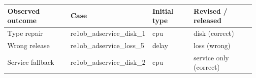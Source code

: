 \begin{tabular*}{\linewidth}{@{\extracolsep{\fill}}llll@{}}
\toprule
Observed outcome & Case & Initial type & Revised / released \\
\midrule
Type repair & re1ob\_adservice\_disk\_1 & cpu & disk (correct) \\
Wrong release & re1ob\_adservice\_loss\_5 & delay & loss (wrong) \\
Service fallback & re1ob\_adservice\_disk\_2 & cpu & service only (correct) \\
\bottomrule
\end{tabular*}
